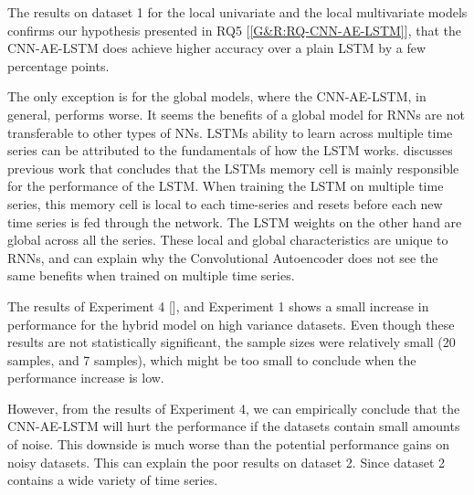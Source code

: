 The results on dataset 1 for the local univariate and the local multivariate models
confirms our hypothesis presented in RQ5 [\ref{G&R:RQ-CNN-AE-LSTM}], that the
CNN-AE-LSTM does achieve higher accuracy over a plain LSTM by a few percentage points.

The only exception is for the global models, where the CNN-AE-LSTM, in general, performs worse.
It seems the benefits of a global model for RNNs are not transferable to other types
of NNs. LSTMs ability to learn across multiple time series can be attributed to the fundamentals
of how the LSTM works. \cite{Zhao2019} discusses previous work that concludes that
the LSTMs memory cell is mainly responsible for the performance of the LSTM.
When training the LSTM on multiple time series, this memory cell is local to each
time-series and resets before each new time series is fed through the network.
The LSTM weights on the other hand are global across all the series.
These local and global characteristics are unique to RNNs, and can explain
why the Convolutional Autoencoder does not see the same benefits when trained on multiple
time series.

The results of Experiment 4 [],
and Experiment 1 shows a small increase in performance for the hybrid model on high variance datasets.
Even though these results are not statistically significant, the sample sizes were relatively small
(20 samples, and 7 samples), which might be too small to conclude when the
performance increase is low.

However, from the results of Experiment 4, we can empirically conclude that the CNN-AE-LSTM will
hurt the performance if the datasets contain small amounts of noise. This downside is much
worse than the potential performance gains on noisy datasets.
This can explain the poor results on dataset 2. Since dataset 2 contains a wide variety
of time series.




